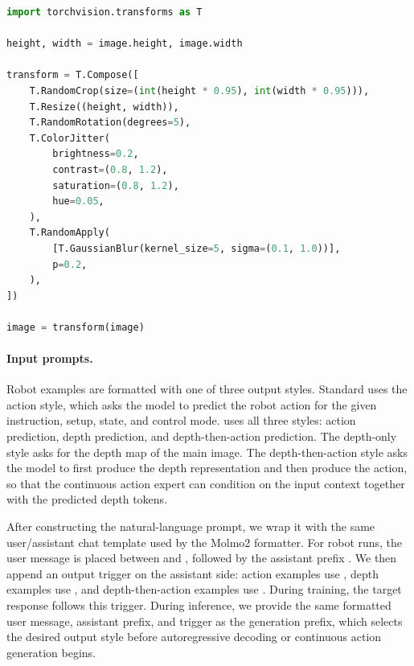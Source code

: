 \begin{center}
\begin{minipage}{0.78\linewidth}
\begin{lstlisting}[language=Python,basicstyle=\ttfamily\footnotesize,breaklines=true,frame=single,framerule=0.4pt]
import torchvision.transforms as T

height, width = image.height, image.width

transform = T.Compose([
    T.RandomCrop(size=(int(height * 0.95), int(width * 0.95))),
    T.Resize((height, width)),
    T.RandomRotation(degrees=5),
    T.ColorJitter(
        brightness=0.2,
        contrast=(0.8, 1.2),
        saturation=(0.8, 1.2),
        hue=0.05,
    ),
    T.RandomApply(
        [T.GaussianBlur(kernel_size=5, sigma=(0.1, 1.0))],
        p=0.2,
    ),
])

image = transform(image)
\end{lstlisting}
\end{minipage}
\end{center}

\paragraph{Input prompts.}
Robot examples are formatted with one of three output styles. Standard
\molmoactt uses the action style, which asks the model to predict the robot
action for the given instruction, setup, state, and control mode.
\molmothink uses all three styles: action prediction, depth prediction, and
depth-then-action prediction. The depth-only style asks for the depth map of
the main image. The depth-then-action style asks the model to first produce the
depth representation and then produce the action, so that the continuous action
expert can condition on the input context together with the predicted depth
tokens.

After constructing the natural-language prompt, we wrap it with the same
user/assistant chat template used by the Molmo2 formatter. For robot runs, the
user message is placed between \texttt{} and
\texttt{}, followed by the assistant prefix
\texttt{}. We then append an output trigger
on the assistant side: action examples use
\texttt{}, depth examples use
\texttt{}, and depth-then-action examples use
\texttt{}. During training, the
target response follows this trigger. During inference, we provide the same
formatted user message, assistant prefix, and trigger as the generation prefix,
which selects the desired output style before autoregressive decoding or
continuous action generation begins.

